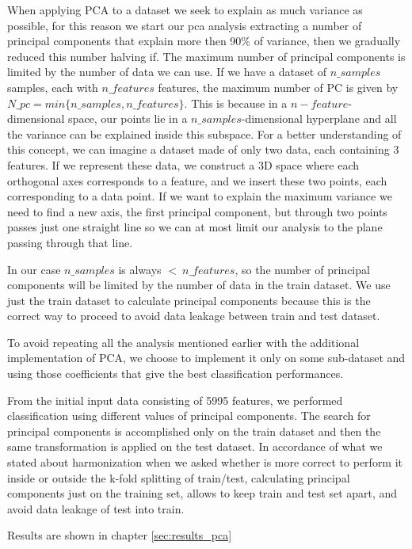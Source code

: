 \documentclass[11pt]{report}
\begin{document}
When applying PCA to a dataset we seek to explain as much variance as possible, for this reason we start our pca analysis extracting a number of principal components that explain more then 90$\%$ of variance, then we gradually reduced this number halving if.
The maximum number of principal components is limited by the number of data we can use. If we have a dataset of $n\_samples$ samples, each with $n\_features$ features, the maximum number of PC is given by $N\_pc = min\{n\_samples, n\_features\}$.
This is because in a $n-feature$-dimensional space, our points lie in a $n\_samples$-dimensional hyperplane and all the variance can be explained inside this subspace.
For a better understanding of this concept, we can imagine a dataset made of only two data, each containing 3 features. If we represent these data, we construct a 3D space where each orthogonal axes corresponds to a feature, and we insert these two points, each corresponding to a data point.
If we want to explain the maximum variance we need to find a new axis, the first principal component, but through two points passes just one straight line so we can at most limit our analysis to the plane passing through that line.

In our case $n\_samples$ is always $< \ n\_features$, so the number of principal components will be limited by the number of data in the train dataset.
We use just the train dataset to calculate principal components because this is the correct way to proceed to avoid data leakage between train and test dataset.

To avoid repeating all the analysis mentioned earlier with the additional implementation of PCA, we choose to implement it only on some sub-dataset and using those coefficients that give the best classification performances.

From the initial input data consisting of 5995 features, we performed classification using different values of principal components. The search for principal components is accomplished only on the train dataset and then the same transformation is applied on the test dataset. In accordance of what we stated about harmonization when we asked whether is more correct to perform it inside or outside the k-fold splitting of train/test, calculating principal components just on the training set, allows to keep train and test set apart, and avoid data leakage of test into train.

Results are shown in chapter \ref{sec:results_pca}
\end{document}
